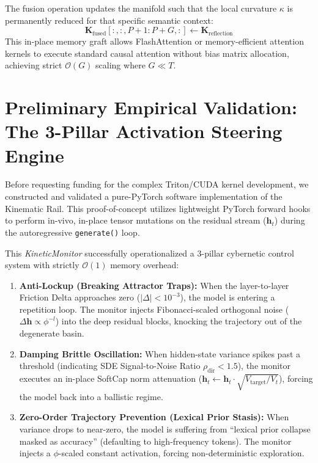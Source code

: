 \documentclass[11pt]{article}
\begin{document}
The fusion operation updates the manifold such that the local curvature $\kappa$ is permanently reduced for that specific semantic context:
\begin{equation}
\mathbf{K}_{\text{fused}}[:, :, P+1:P+G, :] \leftarrow \mathbf{K}_{\text{reflection}}
\end{equation}
This in-place memory graft allows FlashAttention or memory-efficient attention kernels to execute standard causal attention without bias matrix allocation, achieving strict $\mathcal{O}(G)$ scaling where $G \ll T$.

\section{Preliminary Empirical Validation: The 3-Pillar Activation Steering Engine}
Before requesting funding for the complex Triton/CUDA kernel development, we constructed and validated a pure-PyTorch software implementation of the Kinematic Rail. This proof-of-concept utilizes lightweight PyTorch forward hooks to perform in-vivo, in-place tensor mutations on the residual stream ($\mathbf{h}_t$) during the autoregressive \texttt{generate()} loop. 

This \textit{KineticMonitor} successfully operationalized a 3-pillar cybernetic control system with strictly $\mathcal{O}(1)$ memory overhead:

\begin{enumerate}[label=\textbf{Pillar \arabic*:}, leftmargin=*]
    \item \textbf{Anti-Lockup (Breaking Attractor Traps):} When the layer-to-layer Friction Delta approaches zero ($|\Delta| < 10^{-3}$), the model is entering a repetition loop. The monitor injects Fibonacci-scaled orthogonal noise ($\Delta \mathbf{h} \propto \phi^{-l}$) into the deep residual blocks, knocking the trajectory out of the degenerate basin.
    \item \textbf{Damping Brittle Oscillation:} When hidden-state variance spikes past a threshold (indicating SDE Signal-to-Noise Ratio $\rho_{\text{dir}} < 1.5$), the monitor executes an in-place SoftCap norm attenuation ($\mathbf{h}_t \leftarrow \mathbf{h}_t \cdot \sqrt{V_{\text{target}} / V_t}$), forcing the model back into a ballistic regime.
    \item \textbf{Zero-Order Trajectory Prevention (Lexical Prior Stasis):} When variance drops to near-zero, the model is suffering from ``lexical prior collapse masked as accuracy'' (defaulting to high-frequency tokens). The monitor injects a $\phi$-scaled constant activation, forcing non-deterministic exploration.
\end{enumerate}
\end{document}
